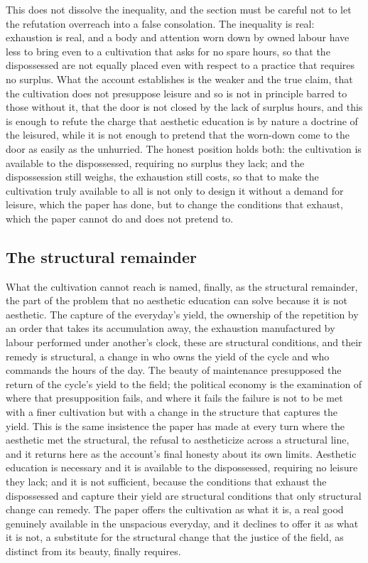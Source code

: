 This does not dissolve the inequality, and the section must be careful not to let the refutation overreach into a false consolation. The inequality is real: exhaustion is real, and a body and attention worn down by owned labour have less to bring even to a cultivation that asks for no spare hours, so that the dispossessed are not equally placed even with respect to a practice that requires no surplus. What the account establishes is the weaker and the true claim, that the cultivation does not presuppose leisure and so is not in principle barred to those without it, that the door is not closed by the lack of surplus hours, and this is enough to refute the charge that aesthetic education is by nature a doctrine of the leisured, while it is not enough to pretend that the worn-down come to the door as easily as the unhurried. The honest position holds both: the cultivation is available to the dispossessed, requiring no surplus they lack; and the dispossession still weighs, the exhaustion still costs, so that to make the cultivation truly available to all is not only to design it without a demand for leisure, which the paper has done, but to change the conditions that exhaust, which the paper cannot do and does not pretend to.

\subsection{The structural remainder}
\label{p22:sub:pe-structural}

What the cultivation cannot reach is named, finally, as the structural remainder, the part of the problem that no aesthetic education can solve because it is not aesthetic. The capture of the everyday's yield, the ownership of the repetition by an order that takes its accumulation away, the exhaustion manufactured by labour performed under another's clock, these are structural conditions, and their remedy is structural, a change in who owns the yield of the cycle and who commands the hours of the day. The beauty of maintenance presupposed the return of the cycle's yield to the field; the political economy is the examination of where that presupposition fails, and where it fails the failure is not to be met with a finer cultivation but with a change in the structure that captures the yield. This is the same insistence the paper has made at every turn where the aesthetic met the structural, the refusal to aestheticize across a structural line, and it returns here as the account's final honesty about its own limits. Aesthetic education is necessary and it is available to the dispossessed, requiring no leisure they lack; and it is not sufficient, because the conditions that exhaust the dispossessed and capture their yield are structural conditions that only structural change can remedy. The paper offers the cultivation as what it is, a real good genuinely available in the unspacious everyday, and it declines to offer it as what it is not, a substitute for the structural change that the justice of the field, as distinct from its beauty, finally requires.

